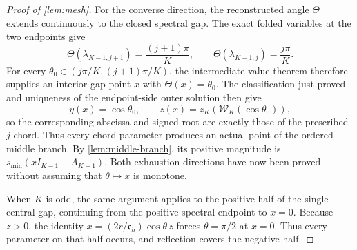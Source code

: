 \documentclass[review,hidelinks,onefignum,onetabnum]{siamart251216}
\begin{document}
\begin{proof}[Proof of \cref{lem:mesh}]
For the converse direction, the reconstructed angle \(\Theta\) extends
continuously to the closed spectral gap.  The exact folded variables at the
two endpoints give
\[
 \Theta(\lambda_{K-1,j+1})=\frac{(j+1)\pi}{K},\qquad
 \Theta(\lambda_{K-1,j})=\frac{j\pi}{K}.
\]
For every \(\theta_0\in(j\pi/K,(j+1)\pi/K)\), the intermediate value
theorem therefore supplies an interior gap point \(x\) with
\(\Theta(x)=\theta_0\).  The classification just proved and uniqueness of
the endpoint-side outer solution then give
\[
 y(x)=\cos\theta_0,\qquad
 z(x)=z_K(\mathcal W_K(\cos\theta_0)),
\]
so the corresponding abscissa and signed root are exactly those of the
prescribed $j$-chord.  Thus every chord parameter produces an actual point of
the ordered middle branch.  By \cref{lem:middle-branch}, its positive
magnitude is \(s_{\min}(xI_{K-1}-A_{K-1})\).  Both exhaustion directions
have now been proved without assuming that \(\theta\mapsto x\) is monotone.

When \(K\) is odd, the same argument applies to the positive half of
the single central gap, continuing from the positive spectral endpoint
to \(x=0\).  Because \(z>0\), the identity
\(x=(2r/\mathfrak c_h)\cos\theta\,z\) forces \(\theta=\pi/2\) at
\(x=0\).
Thus every parameter on that half occurs, and reflection covers the
negative half.


\end{proof}
\end{document}
